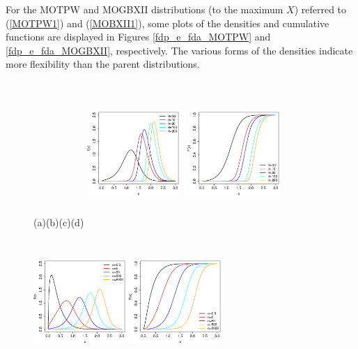 \documentclass[12pt]{article}
\begin{document}
For the MOTPW and MOGBXII distributions (to the maximum $X$) referred to (\ref{MOTPW1}) and (\ref{MOBXII1}), some plots of the densities and cumulative
functions are displayed in Figures \ref{fdp_e_fda_MOTPW} and \ref{fdp_e_fda_MOGBXII}, respectively. The various forms of the densities indicate more
flexibility than the parent distributions.


\begin{figure}[!htb]\small
	\begin{center}
		(a)\hspace{3cm}(b)\hspace{3cm}(c)\hspace{3cm}(d)
		\includegraphics[width=3.5cm,height=5.5cm]{fdp_MOTPW_variando_theta.eps}~
		\includegraphics[width=3.5cm,height=5.5cm]{fda_MOTPW_variando_theta.eps}~
		\includegraphics[width=3.5cm,height=5.5cm]{fdp_MOTPW_variando_alpha.eps}
		\includegraphics[width=3.5cm,height=5.5cm]{fda_MOTPW_variando_alpha.eps}

\end{center}
\end{figure}
\end{document}
